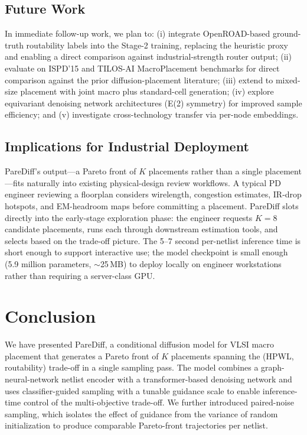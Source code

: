 \documentclass[lettersize,journal]{IEEEtran}
\begin{document}
\subsection{Future Work}

In immediate follow-up work, we plan to: (i) integrate OpenROAD-based ground-truth routability labels into the Stage-2 training, replacing the heuristic proxy and enabling a direct comparison against industrial-strength router output; (ii) evaluate on ISPD'15 and TILOS-AI MacroPlacement benchmarks for direct comparison against the prior diffusion-placement literature; (iii) extend to mixed-size placement with joint macro plus standard-cell generation; (iv) explore equivariant denoising network architectures (E(2) symmetry) for improved sample efficiency; and (v) investigate cross-technology transfer via per-node embeddings.

\subsection{Implications for Industrial Deployment}

PareDiff's output---a Pareto front of $K$ placements rather than a single placement---fits naturally into existing physical-design review workflows. A typical PD engineer reviewing a floorplan considers wirelength, congestion estimates, IR-drop hotspots, and EM-headroom maps before committing a placement. PareDiff slots directly into the early-stage exploration phase: the engineer requests $K = 8$ candidate placements, runs each through downstream estimation tools, and selects based on the trade-off picture. The 5--7 second per-netlist inference time is short enough to support interactive use; the model checkpoint is small enough (5.9 million parameters, $\sim$25\,MB) to deploy locally on engineer workstations rather than requiring a server-class GPU.

\section{Conclusion}
\label{sec:conclusion}

We have presented PareDiff, a conditional diffusion model for VLSI macro placement that generates a Pareto front of $K$ placements spanning the (HPWL, routability) trade-off in a single sampling pass. The model combines a graph-neural-network netlist encoder with a transformer-based denoising network and uses classifier-guided sampling with a tunable guidance scale to enable inference-time control of the multi-objective trade-off. We further introduced paired-noise sampling, which isolates the effect of guidance from the variance of random initialization to produce comparable Pareto-front trajectories per netlist.
\end{document}
